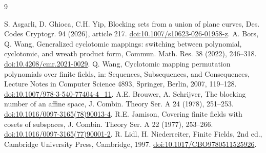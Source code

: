 \documentclass[preprint,12pt,numbers]{elsarticle}
\begin{document}
\begin{thebibliography}{9}
\raggedright
{} S. Asgarli, D. Ghioca, C.H. Yip, Blocking sets from a union of plane curves,
Des. Codes Cryptogr. 94 (2026), article 217.
\href{https://doi.org/10.1007/s10623-026-01958-z}{doi:10.1007/s10623-026-01958-z}.
 A. Bors, Q. Wang, Generalized cyclotomic mappings: switching between polynomial,
cyclotomic, and wreath product form, Commun. Math. Res. 38 (2022), 246--318.
\href{https://doi.org/10.4208/cmr.2021-0029}{doi:10.4208/cmr.2021-0029}.
 Q. Wang, Cyclotomic mapping permutation polynomials over finite fields,
in: Sequences, Subsequences, and Consequences, Lecture Notes in Computer Science
4893, Springer, Berlin, 2007, 119--128.
\href{https://doi.org/10.1007/978-3-540-77404-4_11}{doi:10.1007/978-3-540-77404-4\_11}.
 A.E. Brouwer, A. Schrijver, The blocking number of an affine space,
J. Combin. Theory Ser. A 24 (1978), 251--253.
\href{https://doi.org/10.1016/0097-3165(78)90013-4}{doi:10.1016/0097-3165(78)90013-4}.
 R.E. Jamison, Covering finite fields with cosets of subspaces,
J. Combin. Theory Ser. A 22 (1977), 253--266.
\href{https://doi.org/10.1016/0097-3165(77)90001-2}{doi:10.1016/0097-3165(77)90001-2}.
 R. Lidl, H. Niederreiter, Finite Fields, 2nd ed.,
Cambridge University Press, Cambridge, 1997.
\href{https://doi.org/10.1017/CBO9780511525926}{doi:10.1017/CBO9780511525926}.
\end{thebibliography}
\end{document}
